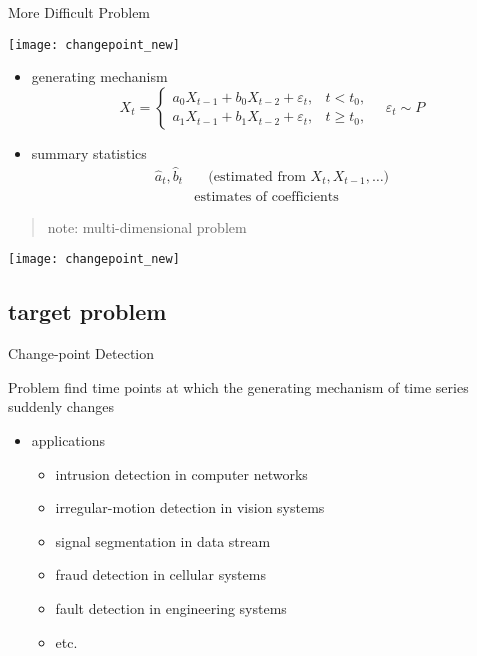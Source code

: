 \documentclass[fleqn,aspectratio=1610]{beamer}
\begin{document}
\begin{frame}[label={sec:orgd7ab62b},t]{More Difficult Problem}
\begin{center}
\texttt{[image: changepoint\_new]}
\end{center}
\begin{overprint}
\begin{itemize}
\item generating mechanism
\begin{equation}
  X_{t}=
  \begin{cases}
    a_{0}X_{t-1}+b_{0}X_{t-2}+\varepsilon_{t},&t<t_{0}, \\
    a_{1}X_{t-1}+b_{1}X_{t-2}+\varepsilon_{t},&t\geq t_{0},       
  \end{cases}
  \quad \varepsilon_{t}\sim P
\end{equation}
\end{itemize}
\begin{itemize}
\item summary statistics
\begin{align}
  \hat{a}_{t}, \hat{b}_{t}
  &\quad
    \text{(estimated from \(X_{t},X_{t-1},\dotsc\))}\\
  &\text{estimates of coefficients}
\end{align}
\end{itemize}
\begin{quote}
note: \alert{multi-dimensional problem}
\end{quote}
\begin{center}
\texttt{[image: changepoint\_new]}
\end{center}
\end{overprint}
\end{frame}

\subsection{target problem}
\label{sec:org88a2375}
\begin{frame}[label={sec:orgd088d70}]{Change-point Detection}
\begin{alertblock}{Problem}
find time points at which 
the generating mechanism of time series suddenly changes
\bigskip
\end{alertblock}
\begin{itemize}
\item applications
\begin{itemize}
\item intrusion detection in computer networks
\item irregular-motion detection in vision systems
\item signal segmentation in data stream
\item fraud detection in cellular systems
\item fault detection in engineering systems
\item etc.
\end{itemize}
\end{itemize}
\end{frame}
\end{document}
